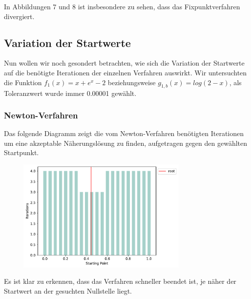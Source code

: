 \documentclass[a4paper,12pt]{article}
\newcommand{\1}{1\hspace{-0,9ex}1}
\begin{document}
In Abbildungen 7 und 8 ist insbesondere zu sehen, dass das Fixpunktverfahren divergiert.

\newpage
\subsection*{Variation der Startwerte}
Nun wollen wir noch gesondert betrachten, wie sich die Variation der Startwerte auf die benötigte Iterationen der einzelnen Verfahren auswirkt. Wir untersuchten die Funktion $f_1(x)=x+e^x-2$ beziehungsweise $g_{1,b}(x)=log(2-x)$, als Toleranzwert wurde immer 0.00001 gewählt.
\subsubsection*{Newton-Verfahren}
Das folgende Diagramm zeigt die vom Newton-Verfahren benötigten Iterationen um eine akzeptable Näherungslösung zu finden, aufgetragen gegen den gewählten Startpunkt.

\begin{figure}[H]
	\centering
	\includegraphics[width=0.75\textwidth]{plots/newton_iterations_by_starting_point.pdf}
\end{figure}

Es ist klar zu erkennen, dass das Verfahren schneller beendet ist, je näher der Startwert an der gesuchten Nullstelle liegt.
\end{document}
